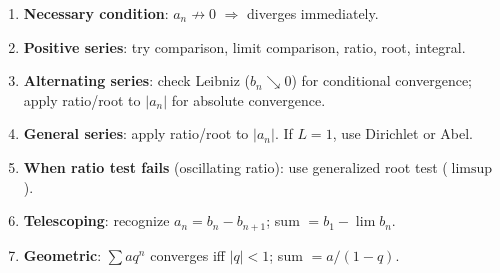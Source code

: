 \documentclass[12pt, a4paper]{article}
\theoremstyle{definition}
\theoremstyle{remark}
\begin{document}
\begin{enumerate}
  \item \textbf{Necessary condition}: $a_n \not\to 0$ $\Rightarrow$ diverges immediately.
  \item \textbf{Positive series}: try comparison, limit comparison, ratio, root, integral.
  \item \textbf{Alternating series}: check Leibniz ($b_n \searrow 0$) for conditional convergence; apply ratio/root to $|a_n|$ for absolute convergence.
  \item \textbf{General series}: apply ratio/root to $|a_n|$. If $L=1$, use Dirichlet or Abel.
  \item \textbf{When ratio test fails} (oscillating ratio): use generalized root test ($\limsup$).
  \item \textbf{Telescoping}: recognize $a_n = b_n - b_{n+1}$; sum $= b_1 - \lim b_n$.
  \item \textbf{Geometric}: $\sum a q^n$ converges iff $|q|<1$; sum $= a/(1-q)$.
\end{enumerate}
\end{document}

